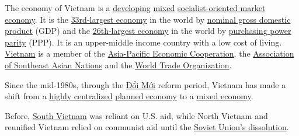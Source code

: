 \documentclass[openany]{book}
\begin{document}
\begin{sloppypar}\RaggedRight
The economy of Vietnam is a \href{https://en.wikipedia.org/wiki/Developing_economy}{developing} \href{https://en.wikipedia.org/wiki/Mixed_economy}{mixed} \href{https://en.wikipedia.org/wiki/Socialist-oriented_market_economy}{socialist-oriented market economy}\cite{3}. It is the \href{https://en.wikipedia.org/wiki/List_of_countries_by_GDP_(nominal)}{33rd-largest economy} in the world by \href{https://en.wikipedia.org/wiki/Nominal_gross_domestic_product}{nominal gross domestic product} (GDP) and the \href{https://en.wikipedia.org/wiki/List_of_countries_by_GDP_(PPP)}{26th-largest economy} in the world by \href{https://en.wikipedia.org/wiki/Purchasing_power_parity}{purchasing power parity} (PPP). It is an upper-middle income country with a low cost of living. \href{https://en.wikipedia.org/wiki/Vietnam}{Vietnam} is a member of the \href{https://en.wikipedia.org/wiki/Asia-Pacific_Economic_Cooperation}{Asia-Pacific Economic Cooperation}, the \href{https://en.wikipedia.org/wiki/Association_of_Southeast_Asian_Nations}{Association of Southeast Asian Nations} and the \href{https://en.wikipedia.org/wiki/World_Trade_Organization}{World Trade Organization}.
\end{sloppypar}



\begin{sloppypar}
    Since the mid-1980s, through the
    \href{https://en.wikipedia.org/wiki/%C4%90%E1%BB%95i_M%E1%BB%9Bi}{Đổi Mới} reform period, Vietnam has made a shift from a 
    \href{https://en.wikipedia.org/wiki/Centralization}{highly centralized}
    \href{https://en.wikipedia.org/wiki/Planned_economy}{planned economy} to a
    \href{https://en.wikipedia.org/wiki/Mixed_economy}{mixed economy}.

    Before, \href{https://en.wikipedia.org/wiki/North_Vietnam}{South Vietnam} was reliant on U.S. aid,\cite{26}
    while North Vietnam and reunified Vietnam relied on communist aid until the
    \href{https://en.wikipedia.org/wiki/Dissolution_of_the_Soviet_Union}{Soviet Union's dissolution}.\cite{27}
\end{sloppypar}
\end{document}
